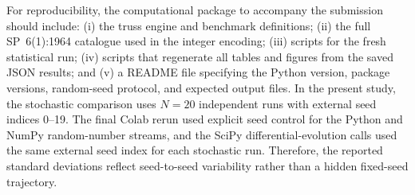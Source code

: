 \documentclass[lineno,pdflatex,sn-mathphys-num]{sn-jnl}
\begin{document}
For reproducibility, the computational package to accompany the submission
should include: (i) the truss engine and benchmark definitions; (ii) the full
SP~6(1):1964 catalogue used in the integer encoding; (iii) scripts for the
fresh statistical run; (iv) scripts that regenerate all tables and figures from
the saved JSON results; and (v) a README file specifying the Python version,
package versions, random-seed protocol, and expected output files. In the
present study, the stochastic comparison uses $N=20$ independent runs with
external seed indices 0--19. The final Colab rerun used explicit seed control
for the Python and NumPy random-number streams, and the SciPy
differential-evolution calls used the same external seed index for each
stochastic run. Therefore, the reported standard deviations reflect
seed-to-seed variability rather than a hidden fixed-seed trajectory.
\end{document}
